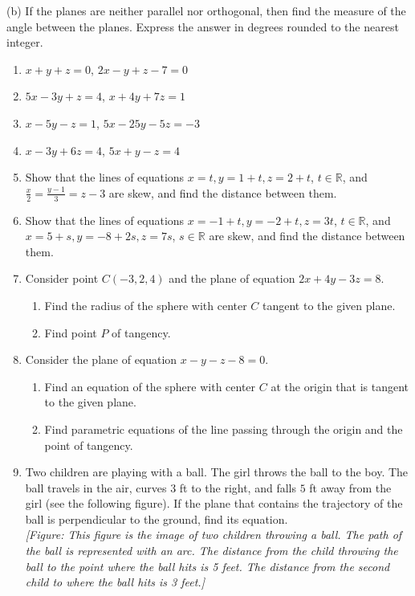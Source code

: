 \documentclass{exercises}
\begin{document}
(b) If the planes are neither parallel nor orthogonal, then find the measure of the angle between the planes. Express the answer in degrees rounded to the nearest integer.

\begin{enumerate}[resume]
\item \techrequired $x+y+z=0$, $2x-y+z-7=0$
\item $5x-3y+z=4$, $x+4y+7z=1$
\item $x-5y-z=1$, $5x-25y-5z=-3$
\item \techrequired $x-3y+6z=4$, $5x+y-z=4$
\item Show that the lines of equations $x=t,y=1+t,z=2+t$, $t\in \mathbb{R}$, and $\frac{x}{2}=\frac{y-1}{3}=z-3$ are skew, and find the distance between them.
\item Show that the lines of equations $x=-1+t,y=-2+t,z=3t$, $t\in \mathbb{R}$, and $x=5+s,y=-8+2s,z=7s$, $s\in \mathbb{R}$ are skew, and find the distance between them.
\item Consider point $C(-3,2,4)$ and the plane of equation $2x+4y-3z=8$.
\begin{enumerate}[label=(\alph*)]
  \item Find the radius of the sphere with center $C$ tangent to the given plane.
  \item Find point $P$ of tangency.
\end{enumerate}
\item Consider the plane of equation $x-y-z-8=0$.
\begin{enumerate}[label=(\alph*)]
  \item Find an equation of the sphere with center $C$ at the origin that is tangent to the given plane.
  \item Find parametric equations of the line passing through the origin and the point of tangency.
\end{enumerate}
\item Two children are playing with a ball. The girl throws the ball to the boy. The ball travels in the air, curves $3$ ft to the right, and falls $5$ ft away from the girl (see the following figure). If the plane that contains the trajectory of the ball is perpendicular to the ground, find its equation. \\ \textit{[Figure: This figure is the image of two children throwing a ball. The path of the ball is represented with an arc. The distance from the child throwing the ball to the point where the ball hits is 5 feet. The distance from the second child to where the ball hits is 3 feet.]}

\end{enumerate}
\end{document}
